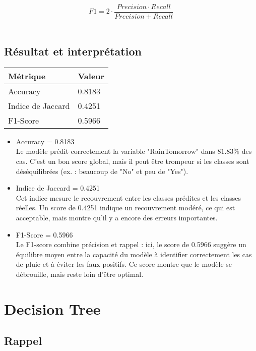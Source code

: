 \documentclass[a4paper,11pt]{article}
\begin{document}
	$$
	F1 = 2 \cdot \frac{Precision \cdot Recall}{Precision + Recall}
	$$
	\\
	\subsection{Résultat et interprétation}
	\begin{center}
		\begin{tabular}{|l|l|}
			\hline
			\textbf{Métrique} & \textbf{Valeur}  \\
			\hline
			Accuracy & 0.8183 \\
			\hline
			Indice de Jaccard & 0.4251 \\
			\hline
			F1-Score & 0.5966 \\
			\hline
		\end{tabular}
	\end{center}
	
	\begin{itemize}
		\item Accuracy = 0.8183 \\
		Le modèle prédit correctement la variable "RainTomorrow" dans $81.83 \%$ des cas.
		C’est un bon score global, mais il peut être trompeur si les classes sont déséquilibrées (ex. : beaucoup de "No" et peu de "Yes").
		
		\item  Indice de Jaccard = 0.4251\\
		Cet indice mesure le recouvrement entre les classes prédites et les classes réelles.
		Un score de 0.4251 indique un recouvrement modéré, ce qui est acceptable, mais montre qu’il y a encore des erreurs importantes.
		\newpage
		\item F1-Score = 0.5966 \\
		Le F1-score combine précision et rappel : ici, le score de 0.5966 suggère un équilibre moyen entre la capacité du modèle à identifier correctement les cas de pluie et à éviter les faux positifs.
		Ce score montre que le modèle se débrouille, mais reste loin d'être optimal.
	\end{itemize}
	
	\newpage
	\vspace{1.5cm}
	\section{Decision Tree}
	\subsection{Rappel}
	\indent
	
\end{document}
